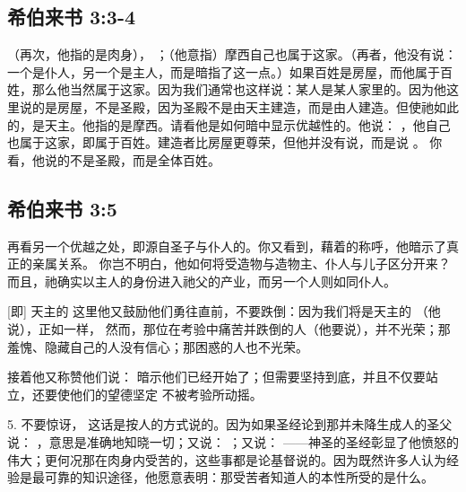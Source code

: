 \subsection{希伯来书 3:3-4}

（再次，他指的是肉身）， ；（他意指）摩西自己也属于这家。（再者，他没有说：一个是仆人，另一个是主人，而是暗指了这一点。）如果百姓是房屋，而他属于百姓，那么他当然属于这家。因为我们通常也这样说：某人是某人家里的。因为他这里说的是房屋，不是圣殿，因为圣殿不是由天主建造，而是由人建造。但使祂如此的，是天主。他指的是摩西。请看他是如何暗中显示优越性的。他说： ，他自己也属于这家，即属于百姓。建造者比房屋更尊荣，但他并没有说，而是说 。 你看，他说的不是圣殿，而是全体百姓。\par


\subsection{希伯来书 3:5}

 再看另一个优越之处，即源自圣子与仆人的。你又看到，藉着的称呼，他暗示了真正的亲属关系。  你岂不明白，他如何将受造物与造物主、仆人与儿子区分开来？而且，祂确实以主人的身份进入祂父的产业，而另一个人则如同仆人。\par

 [即] 天主的  这里他又鼓励他们勇往直前，不要跌倒：因为我们将是天主的 （他说），正如一样， 然而，那位在考验中痛苦并跌倒的人（他要说），并不光荣；那羞愧、隐藏自己的人没有信心；那困惑的人也不光荣。\par

接着他又称赞他们说： 暗示他们已经开始了；但需要坚持到底，并且不仅要站立，还要使他们的望德坚定  不被考验所动摇。\par

5. 不要惊讶，  这话是按人的方式说的。因为如果圣经论到那并未降生成人的圣父说： ，意思是准确地知晓一切；又说： ；又说： ——神圣的圣经彰显了他愤怒的伟大；更何况那在肉身内受苦的，这些事都是论基督说的。因为既然许多人认为经验是最可靠的知识途径，他愿意表明：那受苦者知道人的本性所受的是什么。\par


